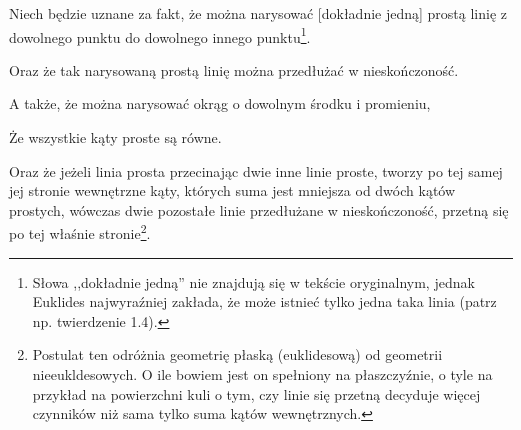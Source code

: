 \item Niech będzie uznane za fakt, że można narysować [dokładnie jedną]
    prostą linię z dowolnego punktu do dowolnego innego punktu\footnote{
        Słowa ,,dokładnie jedną'' nie znajdują się w tekście oryginalnym,
        jednak Euklides najwyraźniej zakłada, że może istnieć tylko jedna
        taka linia (patrz np. twierdzenie 1.4).
    }.
\item Oraz że tak narysowaną prostą linię można przedłużać w nieskończoność.
\item A także, że można narysować okrąg o dowolnym środku i promieniu,
\item Że wszystkie kąty proste są równe.
\item Oraz że jeżeli linia prosta przecinając dwie inne linie proste,
    tworzy po tej samej jej stronie wewnętrzne kąty, których suma jest
    mniejsza od dwóch kątów prostych, wówczas dwie pozostałe linie
    przedłużane w nieskończoność, przetną się po tej właśnie
    stronie\footnote{
        Postulat ten odróżnia geometrię płaską (euklidesową) od geometrii
        nieeukldesowych. O ile bowiem jest on spełniony na płaszczyźnie, o
        tyle na przykład na powierzchni kuli o tym, czy linie się przetną
        decyduje więcej czynników niż sama tylko suma kątów wewnętrznych.
    }.
